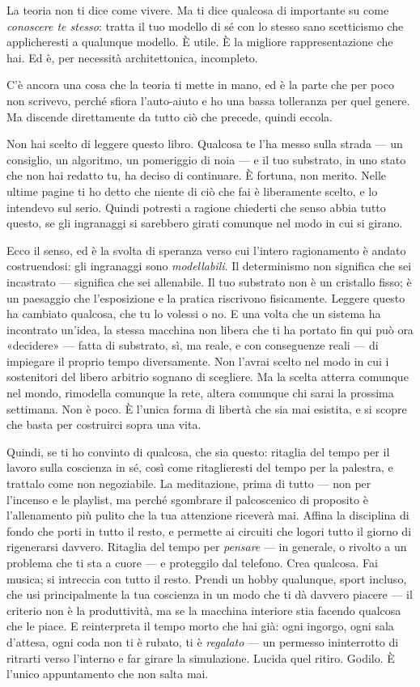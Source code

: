 \documentclass[11pt, twoside, openright]{book}
\begin{document}
La teoria non ti dice come vivere. Ma ti dice qualcosa di importante su come \textit{conoscere te stesso}: tratta il tuo modello di sé con lo stesso sano scetticismo che applicheresti a qualunque modello. È utile. È la migliore rappresentazione che hai. Ed è, per necessità architettonica, incompleto.

C'è ancora una cosa che la teoria ti mette in mano, ed è la parte che per poco non scrivevo, perché sfiora l'auto-aiuto e ho una bassa tolleranza per quel genere. Ma discende direttamente da tutto ciò che precede, quindi eccola.

Non hai scelto di leggere questo libro. Qualcosa te l'ha messo sulla strada --- un consiglio, un algoritmo, un pomeriggio di noia --- e il tuo substrato, in uno stato che non hai redatto tu, ha deciso di continuare. È fortuna, non merito. Nelle ultime pagine ti ho detto che niente di ciò che fai è liberamente scelto, e lo intendevo sul serio. Quindi potresti a ragione chiederti che senso abbia tutto questo, se gli ingranaggi si sarebbero girati comunque nel modo in cui si girano.

Ecco il senso, ed è la svolta di speranza verso cui l'intero ragionamento è andato costruendosi: gli ingranaggi sono \textit{modellabili}. Il determinismo non significa che sei incastrato --- significa che sei allenabile. Il tuo substrato non è un cristallo fisso; è un paesaggio che l'esposizione e la pratica riscrivono fisicamente. Leggere questo ha cambiato qualcosa, che tu lo volessi o no. E una volta che un sistema ha incontrato un'idea, la stessa macchina non libera che ti ha portato fin qui può ora «decidere» --- fatta di substrato, sì, ma reale, e con conseguenze reali --- di impiegare il proprio tempo diversamente. Non l'avrai scelto nel modo in cui i sostenitori del libero arbitrio sognano di scegliere. Ma la scelta atterra comunque nel mondo, rimodella comunque la rete, altera comunque chi sarai la prossima settimana. Non è poco. È l'unica forma di libertà che sia mai esistita, e si scopre che basta per costruirci sopra una vita.

Quindi, se ti ho convinto di qualcosa, che sia questo: ritaglia del tempo per il lavoro sulla coscienza in sé, così come ritaglieresti del tempo per la palestra, e trattalo come non negoziabile. La meditazione, prima di tutto --- non per l'incenso e le playlist, ma perché sgombrare il palcoscenico di proposito è l'allenamento più pulito che la tua attenzione riceverà mai. Affina la disciplina di fondo che porti in tutto il resto, e permette ai circuiti che logori tutto il giorno di rigenerarsi davvero. Ritaglia del tempo per \textit{pensare} --- in generale, o rivolto a un problema che ti sta a cuore --- e proteggilo dal telefono. Crea qualcosa. Fai musica; si intreccia con tutto il resto. Prendi un hobby qualunque, sport incluso, che usi principalmente la tua coscienza in un modo che ti dà davvero piacere --- il criterio non è la produttività, ma se la macchina interiore stia facendo qualcosa che le piace. E reinterpreta il tempo morto che hai già: ogni ingorgo, ogni sala d'attesa, ogni coda non ti è rubato, ti è \textit{regalato} --- un permesso ininterrotto di ritrarti verso l'interno e far girare la simulazione. Lucida quel ritiro. Godilo. È l'unico appuntamento che non salta mai.
\end{document}
